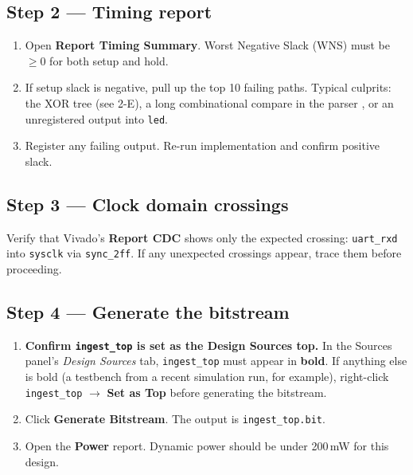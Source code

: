\documentclass[11pt,letterpaper]{article}
\begin{document}
\subsection{Step 2 --- Timing report}
\begin{enumerate}[leftmargin=2em]
	\item Open \textbf{Report Timing Summary}. Worst Negative Slack (WNS) must be $\geq 0$ for both setup and hold.
	\item If setup slack is negative, pull up the top 10 failing paths. Typical culprits: the \CRC{} XOR tree (see 2-E), a long combinational compare in the parser \FSM{}, or an unregistered output into \texttt{led}.
	\item Register any failing output. Re-run implementation and confirm positive slack.
\end{enumerate}


\subsection{Step 3 --- Clock domain crossings}
Verify that Vivado's \textbf{Report CDC} shows only the expected crossing: \texttt{uart\_rxd} into \texttt{sysclk} via \texttt{sync\_2ff}. If any unexpected crossings appear, trace them before proceeding.

\subsection{Step 4 --- Generate the bitstream}
\begin{enumerate}[leftmargin=2em]
	\item \textbf{Confirm \texttt{ingest\_top} is set as the Design Sources top.} In the Sources panel's \textit{Design Sources} tab, \texttt{ingest\_top} must appear in \textbf{bold}. If anything else is bold (a testbench from a recent simulation run, for example), right-click \texttt{ingest\_top} $\to$ \textbf{Set as Top} before generating the bitstream.
	\item Click \textbf{Generate Bitstream}. The output is \texttt{ingest\_top.bit}.
	\item Open the \textbf{Power} report. Dynamic power should be under 200\,mW for this design.
\end{enumerate}
\end{document}
